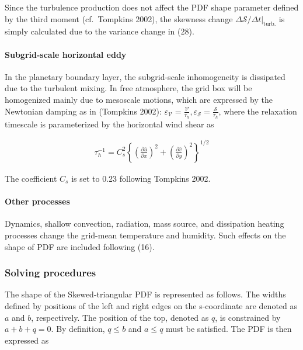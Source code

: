 Since the turbulence production does not affect the PDF shape parameter
defined by the third moment (cf.~Tompkins 2002), the skewness change
\(\Delta \mathcal{S} /\left.\Delta t\right|_{\text {turb.}}\) is simply
calculated due to the variance change in (28).

\hypertarget{subgrid-scale-horizontal-eddy}{%
\paragraph{Subgrid-scale horizontal
eddy}\label{subgrid-scale-horizontal-eddy}}

In the planetary boundary layer, the subgrid-scale inhomogeneity is
dissipated due to the turbulent mixing. In free atmosphere, the grid box
will be homogenized mainly due to mesoscale motions, which are expressed
by the Newtonian damping as in (Tompkins 2002):
\(\varepsilon_{\mathcal{V}}=\frac{\mathcal{V}}{\tau_{h}}, \varepsilon_{\mathcal{S}}=\frac{\mathcal{S}}{\tau_{h}}\),
where the relaxation timescale is parameterized by the horizontal wind
shear as

\begin{eqnarray}
\tau_{h}^{-1}=C_{s}^{2}\left\{\left(\frac{\partial \bar{u}}{\partial x}\right)^{2}+\left(\frac{\partial \bar{v}}{\partial y}\right)^{2}\right\}^{1 / 2}
\end{eqnarray}

The coefficient \(C_{s}\) is set to 0.23 following Tompkins 2002.

\hypertarget{other-processes}{%
\paragraph{Other processes}\label{other-processes}}

Dynamics, shallow convection, radiation, mass source, and dissipation
heating processes change the grid-mean temperature and humidity. Such
effects on the shape of PDF are included following (16).

\hypertarget{solving-procedures}{%
\subsubsection{Solving procedures}\label{solving-procedures}}

The shape of the Skewed-triangular PDF is represented as follows. The
widths defined by positions of the left and right edges on the
s-coordinate are denoted as \(a\) and \(b\), respectively. The position
of the top, denoted as \(q\), is constrained by \(a+b+q=0\). By
definition, \(q \leq b\) and \(a \leq q\) must be satisfied. The PDF is
then expressed as

